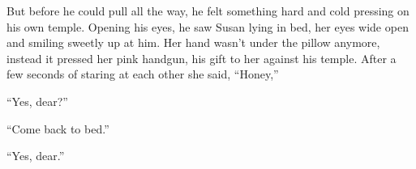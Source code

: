 \documentclass[11pt,letterpaper]{article}
\begin{document}
But before he could pull all the way, he felt something hard and cold pressing on his own temple. Opening his eyes, he saw Susan lying in bed, her eyes wide open and smiling sweetly up at him. Her hand wasn't under the pillow anymore, instead it pressed her pink handgun, his gift to her against his temple. After a few seconds of staring at each other she said, ``Honey,''

``Yes, dear?''

``Come back to bed.''

``Yes, dear.''
\end{document}
